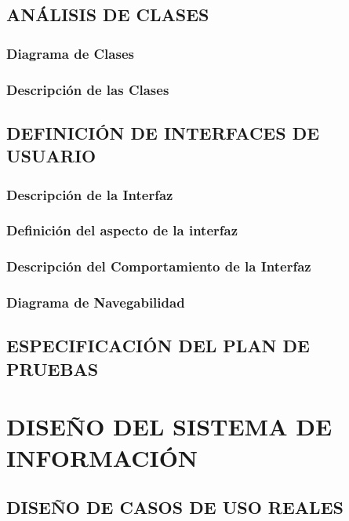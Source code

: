 \documentclass[11pt]{report}
\begin{document}
\newpage
\section{ANÁLISIS DE CLASES}

\subsection{Diagrama de Clases} 

\subsection{Descripción de las Clases}


\newpage
\section{DEFINICIÓN DE INTERFACES DE USUARIO}

\subsection{Descripción de la Interfaz} 

\subsection{Definición del aspecto de la interfaz}

\subsection{Descripción del Comportamiento de la Interfaz} 

\subsection{Diagrama de Navegabilidad}


\newpage
\section{ESPECIFICACIÓN DEL PLAN DE PRUEBAS}


\newpage
\chapter{DISEÑO DEL SISTEMA DE INFORMACIÓN}
	

\newpage


\section{DISEÑO DE CASOS DE USO REALES}
\end{document}
